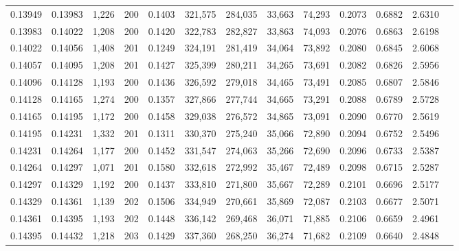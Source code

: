 \begin{tabular}{rrrrrrrrrrrrr}
0.13949 & 0.13983 & 1,226 & 200 &                                     0.1403 & 321,575 & 284,035 &  33,663 &  74,293 & 0.2073 & 0.6882 & 2.6310 \\
0.13983 & 0.14022 & 1,208 & 200 &                                     0.1420 & 322,783 & 282,827 &  33,863 &  74,093 & 0.2076 & 0.6863 & 2.6198 \\
0.14022 & 0.14056 & 1,408 & 201 &                                     0.1249 & 324,191 & 281,419 &  34,064 &  73,892 & 0.2080 & 0.6845 & 2.6068 \\
0.14057 & 0.14095 & 1,208 & 201 &                                     0.1427 & 325,399 & 280,211 &  34,265 &  73,691 & 0.2082 & 0.6826 & 2.5956 \\
0.14096 & 0.14128 & 1,193 & 200 &                                     0.1436 & 326,592 & 279,018 &  34,465 &  73,491 & 0.2085 & 0.6807 & 2.5846 \\
0.14128 & 0.14165 & 1,274 & 200 &                                     0.1357 & 327,866 & 277,744 &  34,665 &  73,291 & 0.2088 & 0.6789 & 2.5728 \\
0.14165 & 0.14195 & 1,172 & 200 &                                     0.1458 & 329,038 & 276,572 &  34,865 &  73,091 & 0.2090 & 0.6770 & 2.5619 \\
0.14195 & 0.14231 & 1,332 & 201 &                                     0.1311 & 330,370 & 275,240 &  35,066 &  72,890 & 0.2094 & 0.6752 & 2.5496 \\
0.14231 & 0.14264 & 1,177 & 200 &                                     0.1452 & 331,547 & 274,063 &  35,266 &  72,690 & 0.2096 & 0.6733 & 2.5387 \\
0.14264 & 0.14297 & 1,071 & 201 &                                     0.1580 & 332,618 & 272,992 &  35,467 &  72,489 & 0.2098 & 0.6715 & 2.5287 \\
0.14297 & 0.14329 & 1,192 & 200 &                                     0.1437 & 333,810 & 271,800 &  35,667 &  72,289 & 0.2101 & 0.6696 & 2.5177 \\
0.14329 & 0.14361 & 1,139 & 202 &                                     0.1506 & 334,949 & 270,661 &  35,869 &  72,087 & 0.2103 & 0.6677 & 2.5071 \\
0.14361 & 0.14395 & 1,193 & 202 &                                     0.1448 & 336,142 & 269,468 &  36,071 &  71,885 & 0.2106 & 0.6659 & 2.4961 \\
0.14395 & 0.14432 & 1,218 & 203 &                                     0.1429 & 337,360 & 268,250 &  36,274 &  71,682 & 0.2109 & 0.6640 & 2.4848 \\

\end{tabular}
